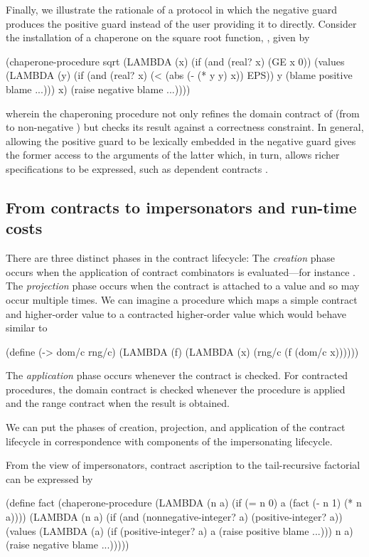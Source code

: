 Finally, we illustrate the rationale of a protocol in which the negative guard produces the positive guard instead of the user providing it to  directly.
Consider the installation of a chaperone on the square root function, , given by
\begin{schemedisplay}
(chaperone-procedure
 sqrt
 (LAMBDA (x)
   (if (and (real? x) (GE x 0))
       (values (LAMBDA (y)
                 (if (and (real? x) (< (abs (- (* y y) x)) EPS))
                     y
                     (blame positive blame ...)))
               x)
       (raise negative blame ...))))
\end{schemedisplay}
wherein the chaperoning procedure not only refines the domain contract of  (from  to non-negative ) but checks its result against a correctness constraint.
In general, allowing the positive guard to be lexically embedded in the negative guard gives the former access to the arguments of the latter which, in turn, allows richer specifications to be expressed, such as dependent contracts \cite{findler2002contracts}.

\subsection{From contracts to impersonators and run-time costs}

There are three distinct phases in the contract lifecycle:
The \emph{creation} phase occurs when the application of contract combinators is evaluated---for instance .
The \emph{projection} phase occurs when the contract is attached to a value and so may occur multiple times.
We can imagine a procedure which maps a simple contract and higher-order value to a contracted higher-order value which would behave similar to
\begin{schemedisplay}
(define (-> dom/c rng/c)
  (LAMBDA (f) (LAMBDA (x) (rng/c (f (dom/c x))))))
\end{schemedisplay}
The \emph{application} phase occurs whenever the contract is checked.
For contracted procedures, the domain contract is checked whenever the procedure is applied and the range contract when the result is obtained.

We can put the phases of creation, projection, and application of the contract lifecycle in correspondence with components of the impersonating lifecycle.

From the view of impersonators, contract ascription to the tail-recursive factorial can be expressed by
\begin{schemedisplay}
(define fact (chaperone-procedure
              (LAMBDA (n a)
                (if (= n 0)
                    a
                    (fact (- n 1) (* n a))))
              (LAMBDA (n a)
                (if (and (nonnegative-integer? a)
                         (positive-integer? a))
                    (values (LAMBDA (a)
                              (if (positive-integer? a)
                                  a
                                  (raise positive blame ...)))
                            n a)
                    (raise negative blame ...)))))
\end{schemedisplay}

